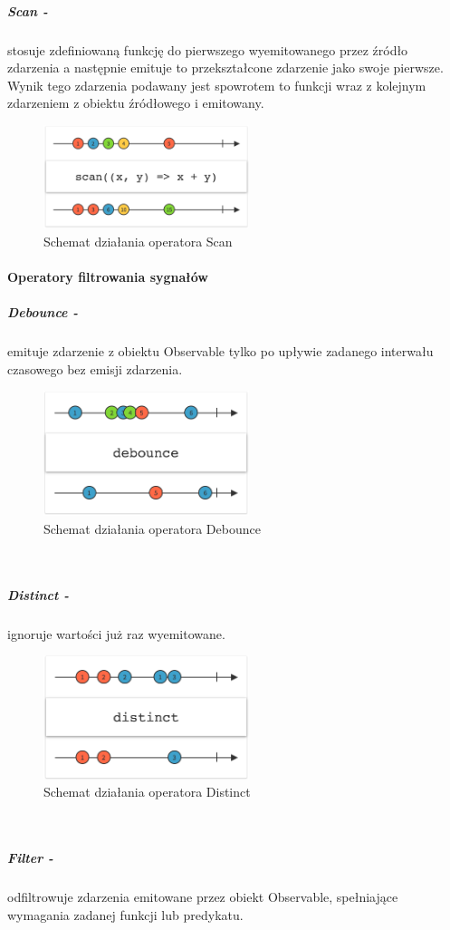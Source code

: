 \documentclass[12pt,oneside,a4paper]{report}
\begin{document}
\subparagraph{Scan -}stosuje zdefiniowaną funkcję do pierwszego wyemitowanego przez źródło zdarzenia a następnie emituje to przekształcone zdarzenie jako swoje pierwsze. Wynik tego zdarzenia podawany jest spowrotem to funkcji wraz z kolejnym zdarzeniem z obiektu źródłowego i emitowany.
\begin{figure}[ht!]
	\centering
	\includegraphics[width=6cm]{scan}
	\caption{Schemat działania operatora Scan}
	\label{scan}
\end{figure}
\pagebreak
\paragraph{Operatory filtrowania sygnałów}
\subparagraph{Debounce -}emituje zdarzenie z obiektu Observable tylko po upływie zadanego interwału czasowego bez emisji zdarzenia.
\begin{figure}[ht!]
	\centering
	\includegraphics[width=6cm]{debounce}
	\caption{Schemat działania operatora Debounce}
	\label{debounce}
\end{figure}\\
\subparagraph{Distinct -}ignoruje wartości już raz wyemitowane.
\begin{figure}[ht!]
	\centering
	\includegraphics[width=6cm]{distinct}
	\caption{Schemat działania operatora Distinct}
	\label{distinct}
\end{figure}\\
\subparagraph{Filter -}odfiltrowuje zdarzenia emitowane przez obiekt Observable, spełniające wymagania zadanej funkcji lub predykatu.
\end{document}
